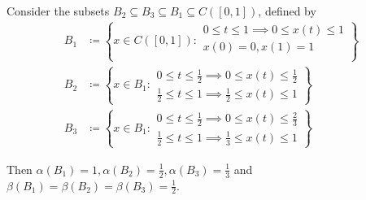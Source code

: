 \begin{example}\label{ex:noncompactness_measures}
  Consider the subsets \( B_2 \subseteq B_3 \subseteq B_1 \subseteq C([0, 1]) \), defined by
  \begin{align*}
    B_1 & \coloneqq \left\{
    x \in C([0, 1]) \colon \begin{aligned}
      0 \leq t \leq 1 \implies 0 \leq x(t) \leq 1 \\
      x(0) = 0, x(1) = 1                          \\
    \end{aligned}
    \right\}
    \\
    B_2 & \coloneqq \left\{
    x \in B_1 \colon \begin{aligned}
      0 \leq t \leq \frac 1 2 \implies 0 \leq x(t) \leq \frac 1 2 \\
      \frac 1 2 \leq t \leq 1 \implies \frac 1 2 \leq x(t) \leq 1
    \end{aligned}
    \right\}
    \\
    B_3 & \coloneqq \left\{
    x \in B_1 \colon \begin{aligned}
      0 \leq t \leq \frac 1 2 \implies 0 \leq x(t) \leq \frac 2 3 \\
      \frac 1 2 \leq t \leq 1 \implies \frac 1 3 \leq x(t) \leq 1
    \end{aligned}
    \right\}
  \end{align*}

  Then \( \alpha(B_1) = 1, \alpha(B_2) = \frac 1 2, \alpha(B_3) = \frac 1 3 \) and \( \beta(B_1) = \beta(B_2) = \beta(B_3) = \frac 1 2 \).
\end{example}
